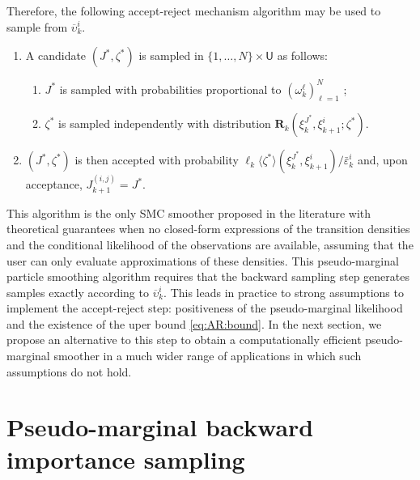 \documentclass{article}
\newcommand{\N}{N}
\newcommand{\hkup}{\bar{\varepsilon}}
\newcommand{\bi}[3]{J_{#1}^{(#2, #3)}}
\newcommand{\ewght}[2]{\ensuremath{\omega_{#1}^{#2}}}
\newcommand{\epart}[2]{\ensuremath{\xi_{#1}^{#2}}}
\newcommand{\marginalset}{\mathsf{U}}
\newcommand{\kernelmarg}{\mathbf{R}}
\newcommand{\hatqg}[1]{\mathsf{\ell}_{#1}}
\begin{document}
Therefore, the following  accept-reject mechanism algorithm may be used to sample from $\overline \upsilon_k^i$.
\begin{enumerate}
\item A candidate $(J^\ast,\zeta^\ast)$ is sampled in $\{1,\ldots, \N\}\times\marginalset$ as follows: 
\begin{enumerate}
\item $J^\ast$ is sampled with probabilities proportional to  $(\ewght{k}{\ell})_{\ell=1}^{\N}$ ;
\item $\zeta^\ast$ is sampled independently with distribution $\kernelmarg_{k}(\epart{k}{J^\ast},\epart{k+1}{i};\zeta^\ast)$.
\end{enumerate}
\item  $(J^\ast,\zeta^\ast)$ is then accepted with probability $\hatqg{k}\langle \zeta^\ast\rangle(\epart{k}{J^\ast}, \epart{k+1}{i})/\hkup_k^i$ and, upon acceptance, $\bi{k+1}{i}{j} = J^*$.
\end{enumerate}
This algorithm is the only SMC smoother proposed in the literature with  theoretical guarantees when no closed-form expressions of  the  transition  densities and the conditional likelihood of the observations are available,  assuming that the user  can only evaluate  approximations of these densities. This pseudo-marginal particle smoothing algorithm  requires that the backward sampling step  generates samples exactly according to $\overline \upsilon_k^i$.  This leads in practice to strong assumptions to implement the accept-reject step: positiveness of the pseudo-marginal likelihood and the existence of the uper bound  \eqref{eq:AR:bound}. In the next section, we propose an alternative to this step to obtain a computationally efficient pseudo-marginal smoother in a much wider range of applications in which such assumptions do not hold.


\section{Pseudo-marginal backward importance sampling}
\end{document}
